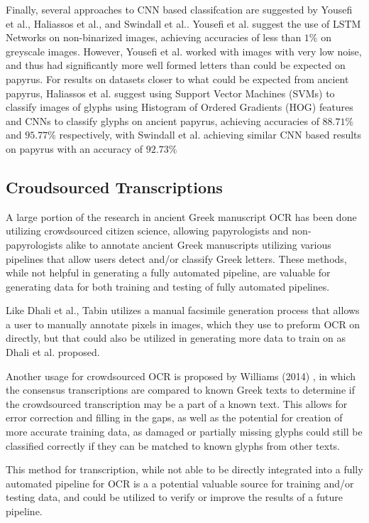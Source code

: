 \documentclass[12pt,a4paper,final]{article}
\begin{document}
Finally, several approaches to CNN based classifcation are suggested by Yousefi et al.\cite{Yousefi}, Haliassos et al.\cite{Haliassos}, and Swindall et al.\cite{Swindall}. Yousefi et al. suggest the use of LSTM Networks on non-binarized images, achieving accuracies of less than $1\%$ on greyscale images. However, Yousefi et al. worked with images with very low noise, and thus had significantly more well formed letters than could be expected on papyrus. For results on datasets closer to what could be expected from ancient papyrus, Haliassos et al.\cite{Haliassos} suggest using Support Vector Machines (SVMs) to classify images of glyphs using Histogram of Ordered Gradients (HOG) features and CNNs to classify glyphs on ancient papyrus, achieving accuracies of $88.71\%$ and $95.77\%$ respectively, with Swindall et al.\cite{Swindall} achieving similar CNN based results on papyrus with an accuracy of $92.73\%$

\subsection{Croudsourced Transcriptions}
A large portion of the research in ancient Greek manuscript OCR has been done utilizing crowdsourced citizen science, allowing papyrologists and non-papyrologists alike to annotate ancient Greek manuscripts utilizing various pipelines that allow users detect and/or classify Greek letters.\cite{Williams2014, Williams2015, Tabin, Atanasiu} These methods, while not helpful in generating a fully automated pipeline, are valuable for generating data for both training and testing of fully automated pipelines.

Like Dhali et al.\cite{Dhali2019}, Tabin\cite{Tabin} utilizes a manual facsimile generation process that allows a user to manually annotate pixels in images, which they use to preform OCR on directly, but that could also be utilized in generating more data to train on as Dhali et al.\cite{Dhali2019} proposed.

Another usage for crowdsourced OCR is proposed by Williams (2014) \cite{Williams2014}, in which the consensus transcriptions are compared to known Greek texts to determine if the crowdsourced transcription may be a part of a known text. This allows for error correction and filling in the gaps, as well as the potential for creation of more accurate training data, as damaged or partially missing glyphs could still be classified correctly if they can be matched to known glyphs from other texts.

This method for transcription, while not able to be directly integrated into a fully automated pipeline for OCR is a a potential valuable source for training and/or testing data, and could be utilized to verify or improve the results of a future pipeline.
\end{document}
